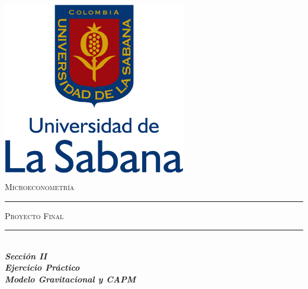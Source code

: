 \begin{titlepage}

\newcommand{\HRule}{\rule{\linewidth}{0.5mm}} %

\center %


\begin{minipage}{14cm}
\center

\includegraphics[width=8cm,height=8cm]{logo1}\\[0.5cm] %


\textsc{\LARGE  Microeconometría \\[0.8cm]}



\rule[1.7mm]{2cm}{0.5mm}
\hfill
\textsc{\Large Proyecto Final} 
\hfill
\rule[1.7mm]{2cm}{0.5mm} 
\\[0.75cm]

{\Huge
\textbf{\textit{
Sección II\\[0.2cm]
Ejercicio Práctico \\[0.5cm]
Modelo Gravitacional y CAPM
}}}\\[0.75cm] 


\end{minipage}
\end{titlepage}

